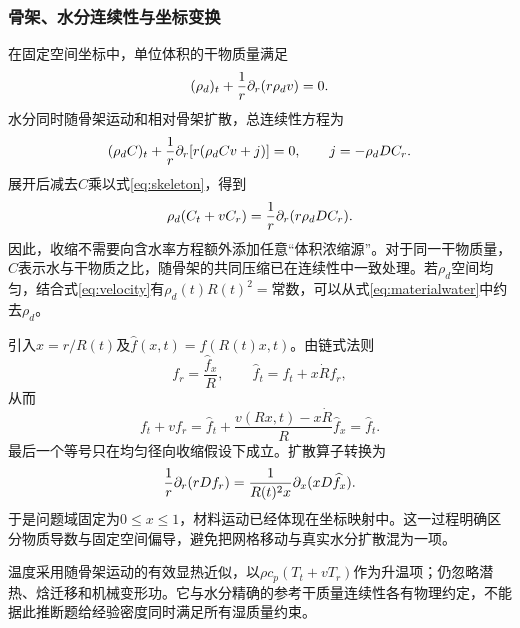 \nextpage
\subsubsection{骨架、水分连续性与坐标变换}
在固定空间坐标中，单位体积的干物质量满足
\begin{equation}
(\rho_d)_t+\frac1r\partial_r(r\rho_dv)=0 .
\label{eq:skeleton}
\end{equation}
水分同时随骨架运动和相对骨架扩散，总连续性方程为
\begin{equation}
(\rho_dC)_t+\frac1r\partial_r[r(\rho_dCv+j)]=0,
\qquad j=-\rho_dD C_r .
\end{equation}
展开后减去$C$乘以式\eqref{eq:skeleton}，得到
\begin{equation}
\rho_d(C_t+vC_r)=\frac1r\partial_r(r\rho_dD C_r).
\label{eq:materialwater}
\end{equation}
因此，收缩不需要向含水率方程额外添加任意“体积浓缩源”。对于同一干物质量，$C$表示水与干物质之比，随骨架的共同压缩已在连续性中一致处理。若$\rho_d$空间均匀，结合式\eqref{eq:velocity}有$\rho_d(t)R(t)^2=\text{常数}$，可以从式\eqref{eq:materialwater}中约去$\rho_d$。

引入$x=r/R(t)$及$\widehat f(x,t)=f(R(t)x,t)$。由链式法则
\begin{equation}
f_r=\frac{\widehat f_x}{R},\qquad
\widehat f_t=f_t+x\dot R f_r ,
\end{equation}
从而
\begin{equation}
f_t+vf_r=
\widehat f_t+\frac{v(Rx,t)-x\dot R}{R}\widehat f_x
=\widehat f_t .
\end{equation}
最后一个等号只在均匀径向收缩假设下成立。扩散算子转换为
\begin{equation}
\frac1r\partial_r(rDf_r)=
\frac{1}{R(t)^2x}\partial_x(xD\widehat f_x).
\label{eq:transform}
\end{equation}
于是问题域固定为$0\le x\le1$，材料运动已经体现在坐标映射中\cite{huang}。这一过程明确区分物质导数与固定空间偏导，避免把网格移动与真实水分扩散混为一项。

温度采用随骨架运动的有效显热近似，以$\rho c_p(T_t+vT_r)$作为升温项；仍忽略潜热、焓迁移和机械变形功。它与水分精确的参考干质量连续性各有物理约定，不能据此推断题给经验密度同时满足所有湿质量约束。

\nextpage
